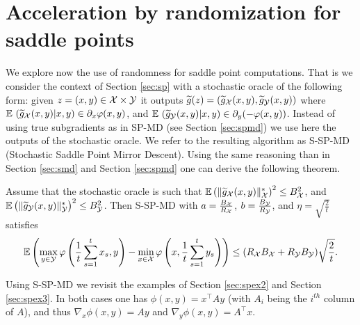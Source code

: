 \section{Acceleration by randomization for saddle points}
We explore now the use of randomness for saddle point computations. That is we consider the context of Section \ref{sec:sp} with a stochastic oracle of the following form: given $z=(x,y) \in \mathcal{X} \times \mathcal{Y}$ it outputs $\widetilde{g}(z) = (\widetilde{g}_{\mathcal{X}}(x,y), \widetilde{g}_{\mathcal{Y}}(x,y))$ where $\mathbb{E} \ (\widetilde{g}_{\mathcal{X}}(x,y) | x,y) \in \partial_x \varphi(x,y)$, and $\E \ (\tg_{\cY}(x,y) | x,y) \in \partial_y (-\phi(x,y))$. Instead of using true subgradients as in SP-MD (see Section \ref{sec:spmd}) we use here the outputs of the stochastic oracle. We refer to the resulting algorithm as S-SP-MD (Stochastic Saddle Point Mirror Descent). Using the same reasoning than in Section \ref{sec:smd} and Section \ref{sec:spmd} one can derive the following theorem.
\begin{theorem} \label{th:sspmd}
Assume that the stochastic oracle is such that $\mathbb{E} \left(\|\widetilde{g}_{\mathcal{X}}(x,y)\|_{\mathcal{X}}^* \right)^2 \leq B_{\mathcal{X}}^2$, and $\mathbb{E} \left(\|\widetilde{g}_{\mathcal{Y}}(x,y)\|_{\mathcal{Y}}^* \right)^2 \leq B_{\mathcal{Y}}^2$. Then S-SP-MD with $a= \frac{B_{\mathcal{X}}}{R_{\mathcal{X}}}$, $b=\frac{B_{\mathcal{Y}}}{R_{\mathcal{Y}}}$, and $\eta=\sqrt{\frac{2}{t}}$ satisfies
$$\mathbb{E} \left( \max_{y \in \mathcal{Y}} \varphi\left( \frac1{t} \sum_{s=1}^t x_s,y \right) - \min_{x \in \mathcal{X}} \varphi\left(x, \frac1{t} \sum_{s=1}^t y_s \right) \right) \leq (R_{\mathcal{X}} B_{\mathcal{X}} + R_{\mathcal{Y}} B_{\mathcal{Y}}) \sqrt{\frac{2}{t}}.$$
\end{theorem}
Using S-SP-MD we revisit the examples of Section \ref{sec:spex2} and Section \ref{sec:spex3}. In both cases one has $\phi(x,y) = x^{\top} A y$ (with $A_i$ being the $i^{th}$ column of $A$), and thus $\nabla_x \phi(x,y) = Ay$ and $\nabla_y \phi(x,y) = A^{\top} x$.
\newline

